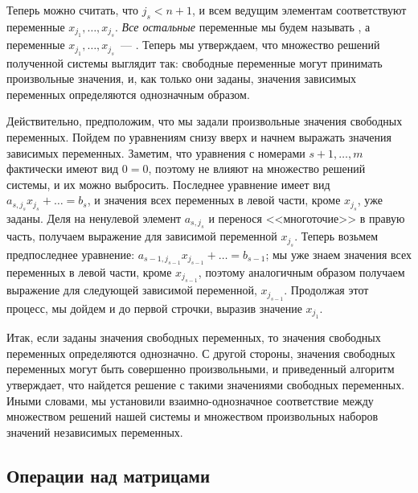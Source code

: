 Теперь можно считать, что $j_s<n+1$, и всем ведущим элементам
соответствуют переменные $x_{j_1},\dots,x_{j_s}$. {\it Все остальные}
переменные мы будем называть , а переменные
$x_{j_1},\dots,x_{j_s}$~--- . Теперь мы утверждаем,
что множество решений полученной системы выглядит так: свободные
переменные могут принимать произвольные значения, и, как только они
заданы, значения зависимых переменных определяются однозначным
образом.

Действительно, предположим, что мы задали произвольные значения
свободных переменных. Пойдем по уравнениям снизу вверх и начнем
выражать значения зависимых переменных. Заметим, что уравнения с
номерами $s+1,\dots,m$ фактически имеют вид $0=0$, поэтому не влияют
на множество решений системы, и их можно выбросить. Последнее
уравнение имеет вид $a_{s,j_s}x_{j_s}+\dots=b_s$, и значения всех
переменных в левой части, кроме $x_{j_s}$, уже заданы. Деля на
ненулевой элемент $a_{s,j_s}$ и перенося <<многоточие>> в правую
часть, получаем выражение для зависимой переменной $x_{j_s}$. Теперь
возьмем предпоследнее уравнение:
$a_{s-1,j_{s-1}}x_{j_{s-1}}+\dots=b_{s-1}$; мы уже знаем значения всех
переменных в левой части, кроме $x_{j_{s-1}}$, поэтому аналогичным
образом получаем выражение для следующей зависимой переменной,
$x_{j_{s-1}}$. Продолжая этот процесс, мы дойдем и до первой строчки,
выразив значение $x_{j_1}$.

Итак, если заданы значения свободных переменных, то значения свободных
переменных определяются однозначно. С другой стороны, значения
свободных переменных могут быть совершенно произвольными, и
приведенный алгоритм утверждает, что найдется решение с такими
значениями свободных переменных. Иными словами, мы установили
взаимно-однозначное соответствие между множеством решений нашей
системы и множеством произвольных наборов значений независимых
переменных.

\subsection{Операции над матрицами}

